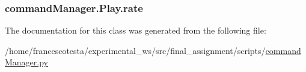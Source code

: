 \subsubsection[{\texorpdfstring{rate}{rate}}]{\setlength{\rightskip}{0pt plus 5cm}command\+Manager.\+Play.\+rate}\hypertarget{classcommandManager_1_1Play_a34aba8df5dfec3560f194934b7e377ad}{}\label{classcommandManager_1_1Play_a34aba8df5dfec3560f194934b7e377ad}


The documentation for this class was generated from the following file\+:\begin{DoxyCompactItemize}
\item 
/home/francescotesta/experimental\+\_\+ws/src/final\+\_\+assignment/scripts/\hyperlink{commandManager_8py}{command\+Manager.\+py}\end{DoxyCompactItemize}
